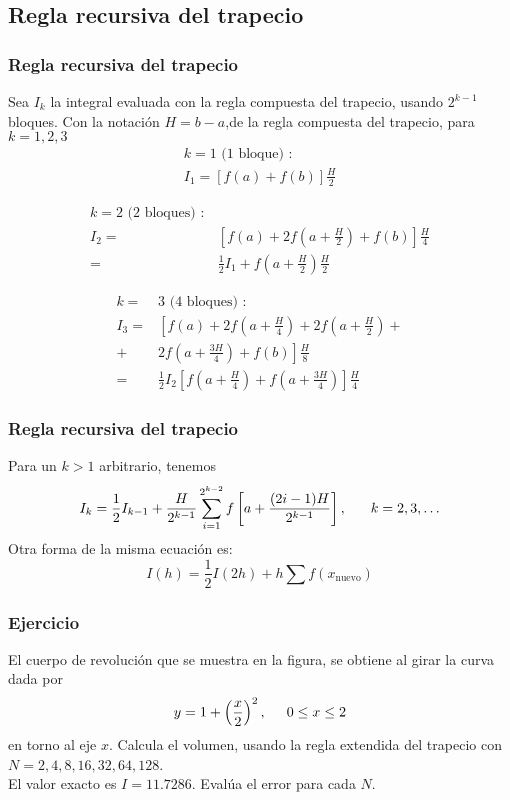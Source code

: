 \subsection{Regla recursiva del trapecio}
\begin{frame}
\frametitle{Regla recursiva del trapecio}
Sea $I_{k}$ la integral evaluada con la regla compuesta del trapecio, usando $2^{k-1}$ bloques. Con la notación $H=b-a$,de la regla compuesta del trapecio, para $k=1,2,3$
\[
	\begin{split}
		k=1 \text{ (1 bloque) }: \\
		I_{1} = [f(a) + f(b)] \frac{H}{2}
	\end{split}
\]
\end{frame}
\begin{frame}
\[
	\begin{split}
		k=2 \text{ (2 bloques) }: \\
		I_{2} =& \left[ f(a) + 2f\left(a+\frac{H}{2} \right) + f(b) \right] \frac{H}{4} \\
		=& \frac{1}{2} I_{1} + f \left( a + \frac{H}{2} \right) \frac{H}{2}
	\end{split}
\]
\end{frame}
\begin{frame}
\[
	\begin{split}
		k=&3 \text{ (4 bloques) }: \\
		I_{3} =& \left[ f(a) + 2f \left(a + \frac{H}{4} \right) + 2 f \left( a + \frac{H}{2} \right) + \right.\\
		 +& \left. 2 f \left( a + \frac{3H}{4} \right)+ f(b) \right] \frac{H}{8} \\
		=& \frac{1}{2} I_{2} \left[f\left(a+\frac{H}{4} \right) + f\left(a+\frac{3H}{4}\right) \right] \frac{H}{4}
	\end{split}
\]
\end{frame}
\begin{frame}
\frametitle{Regla recursiva del trapecio}
Para un $k>1$ arbitrario, tenemos
\[ I_{k} = \dfrac{1}{2} I_{k-1} + \dfrac{H}{2^{k-1}} \sum_{i=1}^{2^{k-2}} f \left[ a + \dfrac{(2i-1)H}{2^{k-1}} \right], \hspace{0.6cm} k=2,3,\ldots\]
Otra forma de la misma ecuación es:
\[ I(h) = \dfrac{1}{2}I(2h) + h \sum f(x_{\text{nuevo}}) \]
\end{frame}
\begin{frame}
\frametitle{Ejercicio}
El cuerpo de revolución que se muestra en la figura, se obtiene al girar la curva dada por
\[ y= 1 + \left( \dfrac{x}{2} \right)^{2}, \hspace{0.5cm} 0 \leq x \leq 2\]
en torno al eje $x$. Calcula el volumen, usando la regla extendida del trapecio con $N=2,4,8,16,32,64,128$.
\\
\bigskip
El valor exacto es $I=11.7286$. Evalúa el error para cada $N$.
\end{frame}
